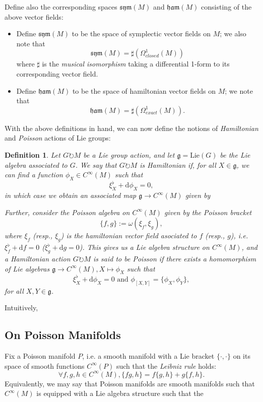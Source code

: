 \documentclass{tufte-handout}
\newtheorem{defn}{Definition}
\def\d{\mathrm{d}}
\begin{document}
Define also the corresponding spaces $\mathfrak{sym}(M)$ and $\mathfrak{ham}(M)$ consisting of the above vector fields:
\begin{itemize}
\item Define $\mathfrak{sym}(M)$ to be the space of symplectic vector fields on $M$; we also note that
$$
\mathfrak{sym}(M) = \sharp(\Omega^1_{closed}(M))
$$
where $\sharp$ is the \emph{musical isomorphism} taking a differential 1-form to its corresponding vector field.

\item Define $\mathfrak{ham}(M)$ to be the space of hamiltonian vector fields on $M$; we note that
$$
\mathfrak{ham}(M) = \sharp(\Omega^1_{exact}(M)).
$$
 \end{itemize}

With the above definitions in hand, we can now define the notions of \emph{Hamiltonian} and \emph{Poisson} actions of Lie groups:
\begin{defn}
Let $G \circlearrowright M$ be a Lie group action, and let $\mathfrak{g} = \mathrm{Lie}(G)$ be the Lie algebra associated to $G$. We say that $G \circlearrowright M$ is \emph{Hamiltonian} if, for all $X \in \mathfrak{g}$, we can find a function $\phi_X \in C^\infty(M)$  such that
$$
\xi^\flat_X + \d \phi_X = 0,
$$
in which case we obtain an associated map $\mathfrak{g} \to C^\infty(M)$ given by %

Further, consider the Poisson algebra on $C^\infty(M)$ given by the Poisson bracket
$$
\{f,g\} := \omega(\xi_f, \xi_g),
$$
where $\xi_f$ (resp., $\xi_g$) is the hamiltonian vector field asociated to $f$ (resp., $g$), i.e. $\xi^\flat_f + \d f = 0$ ($\xi^\flat_g + \d g = 0$). This gives us a Lie algebra structure on $C^\infty(M)$, and a Hamiltonian action $G \circlearrowright M$ is said to be \emph{Poisson} if there exists a homomorphism of Lie algebras $\mathfrak{g} \to C^\infty(M), X \mapsto \phi_X$ such that
$$
\xi^\flat_X + \d \phi_X = 0 \mbox{ and } \phi_{[X,Y]} = \{\phi_X, \phi_Y\},
$$
for all $X,Y \in \mathfrak{g}$.
\end{defn}

Intuitively, %

\subsection{On Poisson Manifolds}
Fix a Poisson manifold $P$, i.e. a smooth manifold with a Lie bracket $\{\cdot,\cdot\}$ on its space of smooth functions $C^\infty(P)$ such that the \emph{Leibniz rule} holds:
$$
\forall f,g,h \in C^\infty(M), \{fg,h\} = f\{g,h\} + g\{f,h\}.
$$
Equivalently, we may say that Poisson manifolds are smooth manifolds such that $C^\infty(M)$ is equipped with a Lie algebra structure such that the %
\end{document}
